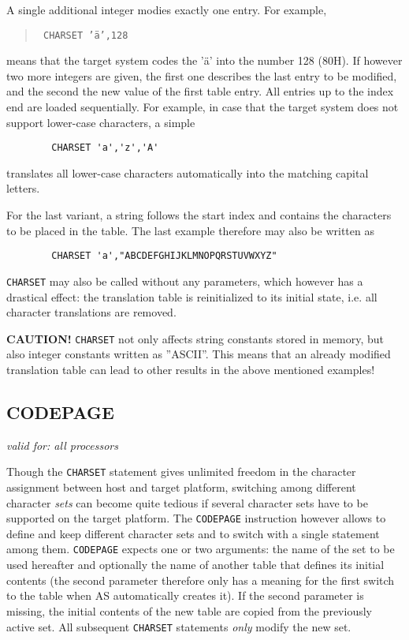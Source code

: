 \documentclass[12pt,twoside]{report}
\makeatletter
\newcommand{\bb}[1]{{\bf #1}}
\newcommand{\tty}[1]{{\tt #1}}
\newcommand{\ttindex}[1]{\index{#1@{\tt #1}}}
\makeatother
\begin{document}
A single additional integer modies exactly one entry.  For example,
\begin{quote}{\tt
       CHARSET  '\"a',128
}\end{quote}
means that the target system codes the '\"a'  into the number 128
(80H).  If however two more integers are given, the first one describes
the last entry to be modified, and the second the new value of the first
table entry.  All entries up to the index end are loaded sequentially.
For example, in case that the target system does not support lower-case
characters, a simple
\begin{verbatim}
        CHARSET 'a','z','A'
\end{verbatim}
translates all lower-case characters  automatically into the
matching capital letters.

For the last variant, a string follows the start index and contains the
characters to be placed in the table.  The last example therefore may also
be written as
\begin{verbatim}
        CHARSET 'a',"ABCDEFGHIJKLMNOPQRSTUVWXYZ"
\end{verbatim}

\tty{CHARSET} may also be called without any parameters, which however has
a drastical effect: the translation table is reinitialized to its initial
state, i.e. all character translations are removed.

\bb{CAUTION!} \tty{CHARSET} not only affects string constants stored in
memory, but also integer constants written as ''ASCII''. This means that
an already modified translation table can lead to other results in the
above mentioned examples!


\subsection{CODEPAGE}
\ttindex{CODEPAGE}

{\em valid for: all processors}

Though the \tty{CHARSET} statement gives unlimited freedom in the
character assignment between host and target platform, switching among
different character {\em sets} can become quite tedious if several
character sets have to be supported on the target platform.  The
\tty{CODEPAGE} instruction however allows to define and keep different
character sets and to switch with a single statement among them.
\tty{CODEPAGE} expects one or two arguments: the name of the set to be
used hereafter and optionally the name of another table that defines its
initial contents (the second parameter therefore only has a meaning for
the first switch to the table when AS automatically creates it).  If the
second parameter is missing, the initial contents of the new table are
copied from the previously active set.  All subsequent \tty{CHARSET}
statements {\em only} modify the new set.
\end{document}

